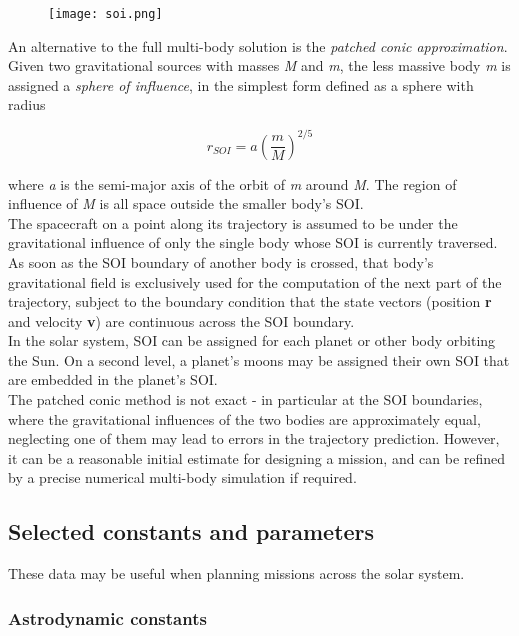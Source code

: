 \documentclass[Orbiter User Manual.tex]{subfiles}
\begin{document}
\begin{figure}[H]
	\centering
	\texttt{[image: soi.png]}
\end{figure}

\noindent
An alternative to the full multi-body solution is the \textit{patched conic approximation}. Given two gravitational sources with masses \textit{M} and \textit{m}, the less massive body \textit{m} is assigned a \textit{sphere of influence}, in the simplest form defined as a sphere with radius

\[ r_{SOI} = a \left( \frac{m}{M} \right)^{2/5} \]

\noindent
where \textit{a} is the semi-major axis of the orbit of \textit{m} around \textit{M}. The region of influence of \textit{M} is all space outside the smaller body's SOI.\\
The spacecraft on a point along its trajectory is assumed to be under the gravitational influence of only the single body whose SOI is currently traversed. As soon as the SOI boundary of another body is crossed, that body's gravitational field is exclusively used for the computation of the next part of the trajectory, subject to the boundary condition that the state vectors (position \textbf{r} and velocity \textbf{v}) are continuous across the SOI boundary.\\
In the solar system, SOI can be assigned for each planet or other body orbiting the Sun. On a second level, a planet's moons may be assigned their own SOI that are embedded in the planet's SOI.\\
The patched conic method is not exact - in particular at the SOI boundaries, where the gravitational influences of the two bodies are approximately equal, neglecting one of them may lead to errors in the trajectory prediction. However, it can be a reasonable initial estimate for designing a mission, and can be refined by a precise numerical multi-body simulation if required.


\subsection{Selected constants and parameters}
These data may be useful when planning missions across the solar system.

\subsubsection{Astrodynamic constants}
\end{document}
